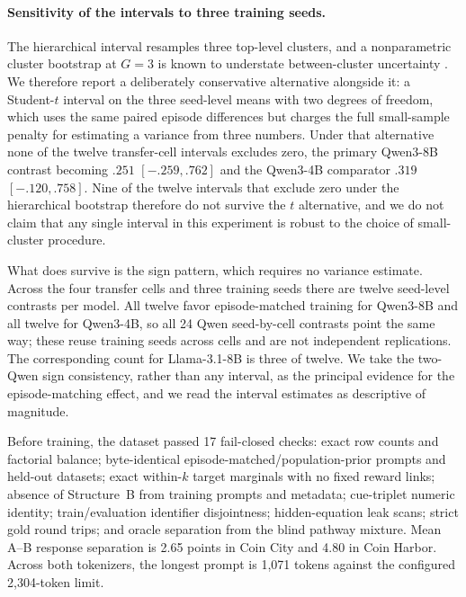 \paragraph{Sensitivity of the intervals to three training seeds.}
\label{app:exp3-coin-cluster-sensitivity}
The hierarchical interval resamples three top-level clusters, and a nonparametric
cluster bootstrap at $G=3$ is known to understate between-cluster uncertainty
\citep{cameron2008bootstrap}. We therefore report a deliberately conservative
alternative alongside it: a Student-$t$ interval on the three seed-level means with
two degrees of freedom, which uses the same paired episode differences but charges
the full small-sample penalty for estimating a variance from three numbers. Under
that alternative none of the twelve transfer-cell intervals excludes
zero, the primary Qwen3-8B contrast becoming $.251$ $[-.259,.762]$ and the Qwen3-4B
comparator $.319$ $[-.120,.758]$. Nine of the twelve intervals that exclude zero
under the hierarchical bootstrap therefore do not survive the $t$ alternative, and we
do not claim that any single interval in this experiment is robust to the choice of
small-cluster procedure.

What does survive is the sign pattern, which requires no variance estimate. Across
the four transfer cells and three training seeds there are twelve seed-level
contrasts per model. All twelve favor episode-matched training for Qwen3-8B and all
twelve for Qwen3-4B, so all 24 Qwen seed-by-cell contrasts point the same way;
these reuse training seeds across cells and are not independent replications. The corresponding count for
Llama-3.1-8B is three of twelve. We take the two-Qwen sign consistency, rather than
any interval, as the principal evidence for the episode-matching effect, and we
read the interval estimates as descriptive of magnitude.

Before training, the dataset passed 17 fail-closed checks: exact row counts and factorial
balance; byte-identical episode-matched/population-prior prompts and held-out datasets; exact
within-$k$ target marginals with no fixed reward links; absence of Structure~B
from training prompts and metadata; cue-triplet numeric identity; train/evaluation
identifier disjointness; hidden-equation leak scans; strict gold round trips; and
oracle separation from the blind pathway mixture. Mean A--B response separation
is 2.65 points in Coin City and 4.80 in Coin Harbor. Across both tokenizers,
the longest prompt is 1,071 tokens against the configured 2,304-token limit.

